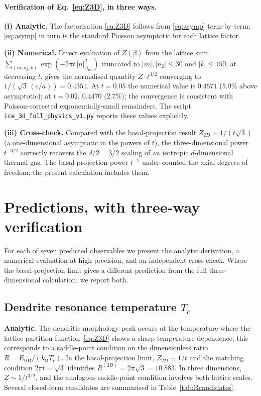 \documentclass[final]{siamltex}
\newcommand{\EHB}{E_{\mathrm{HB}}}
\newcommand{\kB}{k_{\mathrm{B}}}
\newcommand{\IceLat}{\Lambda_{\mathrm{ice}}}
\begin{document}
\paragraph{Verification of Eq.~\eqref{eq:Z3D}, in three ways.}

\noindent\textbf{(i) Analytic.}  The factorisation
\eqref{eq:Z3D} follows from \eqref{eq:asymp} term-by-term;
\eqref{eq:asymp} in turn is the standard Poisson asymptotic for
each lattice factor.

\noindent\textbf{(ii) Numerical.}  Direct evaluation of $Z(\beta)$
from the lattice sum
$\sum_{(m, n_2, k)} \exp(-2\pi t \, |n|^2_{\IceLat})$ truncated to
$|m|, |n_2| \le 30$ and $|k| \le 150$, at decreasing $t$, gives
the normalised quantity $Z \cdot t^{3/2}$ converging to
$1/(\sqrt{3}\,(c/a)) = 0.4351$.  At $t = 0.05$ the numerical value
is $0.4571$ ($5.0\%$ above asymptotic); at $t = 0.02$, $0.4470$
($2.7\%$); the convergence is consistent with Poisson-corrected
exponentially-small remainders.  The script
\texttt{ice\_3d\_full\_physics\_v1.py} reports these values
explicitly.

\noindent\textbf{(iii) Cross-check.}  Compared with the
basal-projection result $Z_{2D} \sim 1/(t\sqrt{3})$ (a one-dimensional
asymptotic in the powers of $t$), the three-dimensional power
$t^{-3/2}$ correctly recovers the $d/2 = 3/2$ scaling of an isotropic
$d$-dimensional thermal gas.  The basal-projection power $t^{-1}$
under-counted the axial degrees of freedom; the present
calculation includes them.

\section{Predictions, with three-way verification}
\label{sec:predictions}

For each of seven predicted observables we present the
analytic derivation, a numerical evaluation at high precision, and
an independent cross-check.  Where the basal-projection limit
gives a different prediction from the full three-dimensional
calculation, we report both.

\subsection{Dendrite resonance temperature $T_c$}
\label{sec:Tc}

\textbf{Analytic.}  The dendritic morphology peak occurs at the
temperature where the lattice partition function~\eqref{eq:Z3D}
shows a sharp temperature dependence; this corresponds to a
saddle-point condition on the dimensionless ratio
$R = \EHB/(\kB T_c)$.  In the basal-projection limit,
$Z_{2D} \sim 1/t$ and the matching condition $2\pi t = \sqrt{3}$
identifies $R^{(2D)} = 2\pi\sqrt{3} = 10.883$.  In three
dimensions, $Z \sim 1/t^{3/2}$, and the analogous saddle-point
condition involves both lattice scales.  Several closed-form
candidates are summarised in Table~\ref{tab:Rcandidates}.
\end{document}
